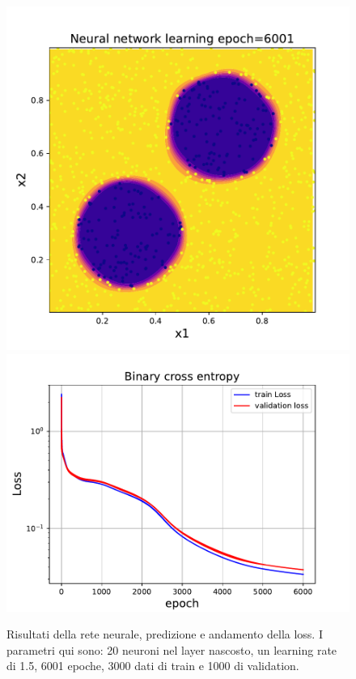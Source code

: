 \documentclass[10pt,a4paper]{article}
\begin{document}
\begin{figure}[h]
\centering
\includegraphics[scale=0.5]{img/6001.pdf}
\includegraphics[scale=0.5]{img/Loss1.pdf}
\caption{Risultati della rete neurale, predizione e andamento della loss. I parametri qui sono: 20 neuroni nel layer nascosto, un learning rate di 1.5, 6001 epoche, 3000 dati di train e 1000 di validation.}
\end{figure}
\FloatBarrier
\end{document}
